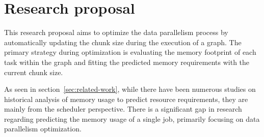 \section{Research proposal}
\label{sec:research-proposal}

This research proposal aims to optimize the data parallelism process by automatically updating the chunk size during the execution of a graph.
The primary strategy during optimization is evaluating the memory footprint of each task within the graph and fitting the predicted memory requirements with the current chunk size.

As seen in section~\ref{sec:related-work}, while there have been numerous studies on historical analysis of memory usage to predict resource requirements, they are mainly from the scheduler perspective.
There is a significant gap in research regarding predicting the memory usage of a single job, primarily focusing on data parallelism optimization.








